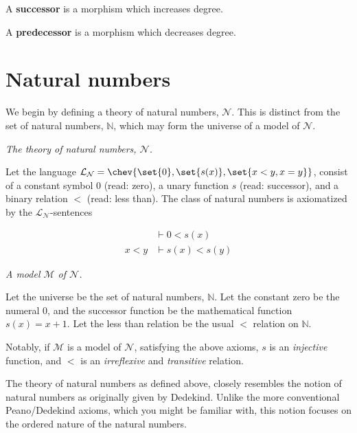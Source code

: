 \begin{definition} A \textbf{successor} is a morphism which increases degree.
\end{definition}

\begin{definition} A \textbf{predecessor} is a morphism which decreases degree.
\end{definition}

\section{Natural numbers}

We begin by defining a theory of natural numbers, $\mathcal{N}$. This is
distinct from the set of natural numbers, $\mathbb{N}$, which may form the
universe of a model of $\mathcal{N}$.

\begin{definition} \textit{The theory of natural numbers, $\mathcal{N}$.}

Let the language
$\mathcal{L}_{\mathcal{N}}=\chev{\set{0},\set{s(x)},\set{x<y,x=y}}$, consist of
a constant symbol $0$ (read: zero), a unary function $s$ (read: successor), and
a binary relation $<$ (read: less than). The class of natural numbers is
axiomatized by the $\mathcal{L}_{\mathcal{N}}$-sentences

\begin{align}
&\vdash 0 < s(x) \\
x < y &\vdash s(x) < s(y)
\end{align}

\end{definition}

\begin{example} \textit{A model $\mathcal{M}$ of $\mathcal{N}$.}

Let the universe be the set of natural numbers, $\mathbb{N}$. Let the constant
zero be the numeral $0$, and the successor function be the mathematical
function $s(x)=x+1$. Let the less than relation be the usual $<$ relation on
$\mathbb{N}$.

Notably, if $\mathcal{M}$ is a model of $\mathcal{N}$, satisfying the above
axioms, $s$ is an \emph{injective} function, and $<$ is an \emph{irreflexive}
and \emph{transitive} relation.

\end{example}

\begin{remark}

The theory of natural numbers as defined above, closely resembles the notion of
natural numbers as originally given by Dedekind\cite{beman-1901,joyce-2005}.
Unlike the more conventional Peano/Dedekind axioms, which you might be familiar
with, this notion focuses on the ordered nature of the natural numbers.

\end{remark}

